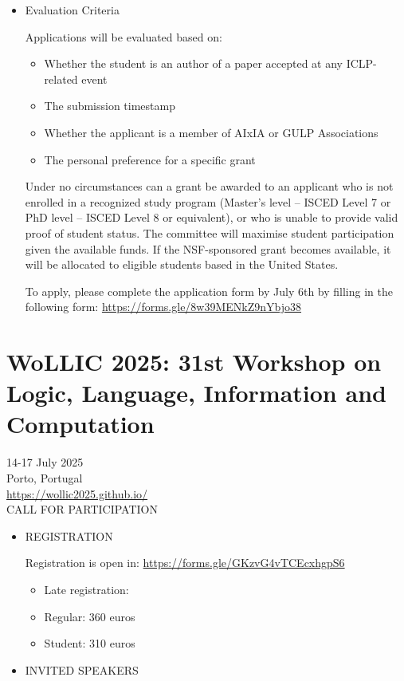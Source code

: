 \documentclass[prodmode,acmtecs]{acmsmall} %
\begin{document}
{\begin{itemize}
\item  Evaluation Criteria 
 
  Applications will be evaluated based on: 
 
\begin{itemize}\item  Whether the student is an author of a paper accepted at any ICLP-related event
\item  The submission timestamp
\item  Whether the applicant is a member of AIxIA or GULP Associations
\item  The personal preference for a specific grant
\end{itemize} 
  Under no circumstances can a grant be awarded to an applicant who is not enrolled in a recognized study program (Master’s level – ISCED Level 7 or PhD level – ISCED Level 8 or equivalent), or who is unable to provide valid proof of student status. The committee will maximise student participation given the available funds. If the NSF-sponsored grant becomes available, it will be allocated to eligible students based in the United States. 
 
  To apply, please complete the application form by July 6th by filling in the following form: \href{https://forms.gle/8w39MENkZ9nYbjo38}{https://forms.gle/8w39MENkZ9nYbjo38} 
 
\end{itemize}\section{WoLLIC 2025: 31st Workshop on Logic, Language, Information and Computation}\label{WoLLIC2025}  14-17 July 2025\\ 
  Porto, Portugal\\ 
  \href{https://wollic2025.github.io/}{https://wollic2025.github.io/}\\ 
CALL FOR PARTICIPATION 

\begin{itemize}\item  REGISTRATION 
 
  Registration is open in: \href{https://forms.gle/GKzvG4vTCEcxhgpS6}{https://forms.gle/GKzvG4vTCEcxhgpS6} 
 
\begin{itemize}\item  Late registration:
\item Regular: 360 euros
\item Student: 310 euros
\end{itemize} 
\item  INVITED SPEAKERS 
 

\end{itemize}}
\end{document}
